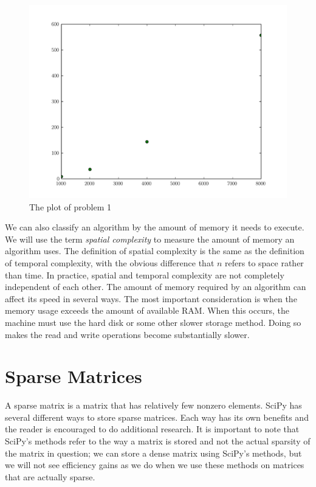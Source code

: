 \begin{figure}
\centering
\includegraphics[width=\textwidth]{prob1.pdf}
\caption{The plot of problem 1}
\label{prob1}
\end{figure}

We can also classify an algorithm by the amount of memory it needs to execute.  We will use the term \emph{spatial complexity} to measure the amount of memory an algorithm uses.  The definition of spatial complexity is the same as the definition of temporal complexity, with the obvious difference that $n$ refers to space rather than time.
In practice, spatial and temporal complexity are not completely independent of each other. The amount of memory required by an algorithm can affect its speed in several ways. The most important consideration is when the memory usage exceeds the amount of available RAM. When this occurs, the machine must use the hard disk or some other slower storage method. Doing so makes the read and write operations become substantially slower.

\section*{Sparse Matrices}
A sparse matrix is a matrix that has relatively few nonzero elements. 
SciPy has several different ways to store sparse matrices. Each way has its own benefits and the reader is encouraged to do additional research. It is important to note that SciPy's  methods refer to the way a matrix is stored and not the actual sparsity of the matrix in question; we can store a dense matrix using SciPy's  methods, but we will not see efficiency gains as we do when we use these methods on matrices that are actually sparse.

